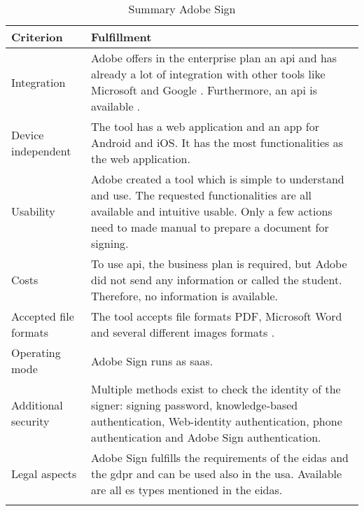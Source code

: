 	\begin{longtable}{|p{4cm}|p{10cm}|} \hline
		\rowcolor{Gray}Criterion & Fulfillment \\ \hline
		Integration & Adobe offers in the enterprise plan an \gls{api} and has already a lot of integration with other tools like Microsoft and Google \parencite{adobesign2018integration,adobesign2018info}. Furthermore, an \gls{api} is available \parencite{adobesign2018api}. \\ \hline
		Device independent & The tool has a web application and an \gls{app} for Android and iOS. It has the most functionalities as the web application. \\ \hline
		Usability & Adobe created a tool which is simple to understand and use. The requested functionalities are all available and intuitive usable. Only a few actions need to made manual to prepare a document for signing. \\ \hline
		Costs & To use \gls{api}, the business plan is required, but Adobe did not send any information or called the student. Therefore, no information is available.\\ \hline
		Accepted file formats & The tool accepts file formats \gls{PDF}, Microsoft Word and several different images formats \parencite{adobesign2018info}. \\ \hline
		Operating mode & Adobe Sign runs as \gls{saas}. \parencite{adobesign2016} \\ \hline
		Additional security & Multiple methods exist to check the identity of the signer: signing password, knowledge-based authentication, Web-identity authentication, phone authentication and Adobe Sign authentication. \parencite{adobesign2018security} \\ \hline
		Legal aspects & Adobe Sign fulfills the requirements of the \gls{eidas} and the \gls{gdpr} and can be used also in the \gls{usa}. Available are all \gls{es} types mentioned in the \gls{eidas}. \parencite{adobesign2018legal,adobesign2018gdpr, adobesign2018es}\\ \hline
	\caption{Summary Adobe Sign}
	\label{tab:adobesign}
	\end{longtable}

